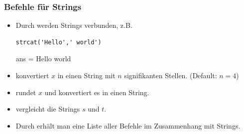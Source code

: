 \documentclass[hyperref={xetex}]{beamer}
\begin{document}
%
%
\begin{frame}[fragile]\frametitle{Befehle für Strings}
\begin{itemize}
\item Durch  werden Strings verbunden, z.B. 
\begin{lstlisting}
strcat('Hello',' world') 
\end{lstlisting}
\begin{matlab}
ans = Hello world 
\end{matlab}
\item \alert{} konvertiert $x$ in einen String mit $n$
  signifikanten Stellen. (Default: $n=4$)
\item \alert{} rundet $x$ und konvertiert es in einen String.
\item \alert{} vergleicht die Strings $s$ und $t$. 
\item Durch \alert{} erhält man eine Liste aller Befehle im
  Zusammenhang mit Strings.
\end{itemize}
\end{frame}
\end{document}
